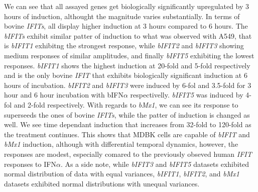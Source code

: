 We can see that all assayed genes get biologically significantly upregulated by 3 hours of induction, althought the magnitude varies substantially. In terms of bovine \textit{IFITs}, all display higher induction at 3 hours compared to 6 hours. The \textit{bIFITs} exhibit similar patter of induction to what was observed with A549, that is \textit{bIFIT1} exhibitng the strongest response, while \textit{bIFIT2} and \textit{bIFIT3} showing medium responses of similar amplitudes, and finally \textit{bIFIT5} exhibiting the lowest responses. \textit{bIFIT1} shows the highest induction at 20-fold and 5-fold respectively and is the only bovine \textit{IFIT} that exhibits biologically significant induction at 6 hours of incubation. \textit{bIFIT2} and \textit{bIFIT3} were induced by 6-fol and 3.5-fold for 3 hour and 6 hour incubation with bIFN\(\alpha\) respectivelly. \textit{bIFIT5} was induced by 4-fol and 2-fold respectively. With regards to \textit{bMx1}, we can see its response to superseeds the ones of bovine \textit{IFITs}, while the patter of induction is changed as well. We see time dependant induction that increases from 32-fold to 120-fold as the treatment continues. This shows that MDBK cells are capable of \textit{bIFIT} and \textit{bMx1} induction, although with differential temporal dynamics, however, the responses are modest, especially comared to the previously obseved human \textit{IFIT} responses to IFN\(\alpha\). As a side note, while \textit{bIFIT3} and \textit{bIFIT5} datasets exhibited normal distribution of data with equal variances, \textit{bIFIT1}, \textit{bIFIT2}, and \textit{bMx1} datasets exhibited normal distributions with unequal variances.

